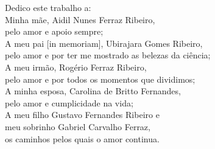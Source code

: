 
\begin{dedicatoria}

\vspace*{\fill}

\begin{flushright}
Dedico este trabalho a:\\
Minha mãe, Aidil Nunes Ferraz Ribeiro,\\
pelo amor e apoio sempre;\\
A meu pai [in memoriam], Ubirajara Gomes Ribeiro,\\
pelo amor e por ter me mostrado as belezas da ciência;\\
A meu irmão, Rogério Ferraz Ribeiro,\\
pelo amor e por todos os momentos que dividimos;\\
A minha esposa, Carolina de Britto Fernandes,\\
 pelo amor e cumplicidade na vida;\\
A meu filho Gustavo Fernandes Ribeiro e\\
meu sobrinho Gabriel Carvalho Ferraz, \\
os caminhos pelos quais o amor continua.
\end{flushright}
\end{dedicatoria}

